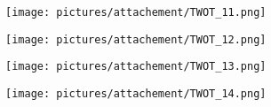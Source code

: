 \begin{figure} \ContinuedFloat
        \centering
        \begin{subfigure}{.49\textwidth}
                \centering
                \texttt{[image: pictures/attachement/TWOT\_11.png]}
        \end{subfigure}
        \begin{subfigure}{.49\textwidth}
                \centering
                \texttt{[image: pictures/attachement/TWOT\_12.png]}
        \end{subfigure}
\end{figure}
\begin{figure} \ContinuedFloat
        \centering
        \begin{subfigure}{.49\textwidth}
                \centering
                \texttt{[image: pictures/attachement/TWOT\_13.png]}
        \end{subfigure}
        \begin{subfigure}{.49\textwidth}
                \centering
                \texttt{[image: pictures/attachement/TWOT\_14.png]}
        \end{subfigure}
\end{figure}